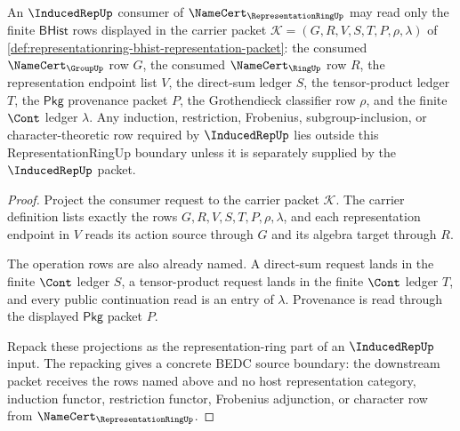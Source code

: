 \begin{theorem}
\label{thm:representationring-consumer-boundary}
An $\InducedRepUp$ consumer of $\NameCert_{\RepresentationRingUp}$ may read
only the finite $\mathsf{BHist}$ rows displayed in the carrier packet
$\mathcal{K}=(G,R,V,S,T,P,\rho,\lambda)$ of
\autoref{def:representationring-bhist-representation-packet}: the consumed
$\NameCert_{\GroupUp}$ row $G$, the consumed $\NameCert_{\RingUp}$ row $R$,
the representation endpoint list $V$, the direct-sum ledger $S$, the
tensor-product ledger $T$, the $\mathsf{Pkg}$ provenance packet $P$, the
Grothendieck classifier row $\rho$, and the finite $\Cont$ ledger
$\lambda$. Any induction, restriction, Frobenius, subgroup-inclusion, or
character-theoretic row required by $\InducedRepUp$ lies outside this
RepresentationRingUp boundary unless it is separately supplied by the
$\InducedRepUp$ packet.
\end{theorem}
\begin{proof}
Project the consumer request to the carrier packet $\mathcal{K}$. The carrier
definition lists exactly the rows $G,R,V,S,T,P,\rho,\lambda$, and each
representation endpoint in $V$ reads its action source through $G$ and its
algebra target through $R$.

The operation rows are also already named. A direct-sum request lands in the
finite $\Cont$ ledger $S$, a tensor-product request lands in the finite
$\Cont$ ledger $T$, and every public continuation read is an entry of
$\lambda$. Provenance is read through the displayed $\mathsf{Pkg}$ packet
$P$.

Repack these projections as the representation-ring part of an
$\InducedRepUp$ input. The repacking gives a concrete BEDC source boundary:
the downstream packet receives the rows named above and no host
representation category, induction functor, restriction functor, Frobenius
adjunction, or character row from $\NameCert_{\RepresentationRingUp}$.
\end{proof}

